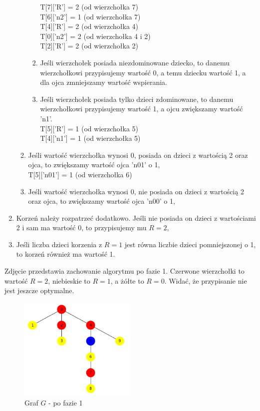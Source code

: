 \begin{enumerate}
\begin{enumerate}
\begin{enumerate}
                T[7]['R'] = 2  (od wierzchołka 7)\\
                T[6]['n2'] = 1  (od wierzchołka 7)\\
                T[4]['R'] = 2  (od wierzchołka 4)\\
                T[0]['n2'] = 2  (od wierzchołka 4 i 2)\\
                T[2]['R'] = 2  (od wierzchołka 2)\
                \item Jeśli wierzchołek posiada niezdominowane dziecko, to danemu wierzchołkowi przypisujemy wartość 0, a temu dziecku wartość 1, a dla ojca zmniejszamy wartość wspierania.
                \item Jeśli wierzchołek posiada tylko dzieci zdominowane, to danemu wierzchołkowi przypisujemy wartość 1, a ojcu zwiększamy wartość 'n1'.\\
                T[5]['R'] = 1  (od wierzchołka 5)\\
                T[4]['n1'] = 1  (od wierzchołka 5)
            \end{enumerate}
        \item Jeśli wartość wierzchołka wynosi 0, posiada on dzieci z wartością 2 oraz ojca, to zwiększamy wartość ojca 'n01' o 1,\\
        T[5]['n01'] = 1  (od wierzchołka 6)
        \item Jeśli wartość wierzchołka wynosi 0, nie posiada on dzieci z wartością 2 oraz ojca, to zwiększamy wartość ojca 'n00' o 1,\\
    \end{enumerate}
    \item Korzeń należy rozpatrzeć dodatkowo. Jeśli nie posiada on dzieci z wartościami 2 i sam ma wartość 0, to przypisujemy mu $R=2$,
    \item Jeśli liczba dzieci korzenia z $R=1$ jest równa liczbie dzieci pomniejszonej o 1, to korzeń również ma wartość 1.
\end{enumerate}

Zdjęcie przedstawia zachowanie algorytmu po fazie 1. Czerwone wierzchołki to wartość $R=2$, niebieskie to $R=1$, a żółte to $R=0$. Widać, że przypisanie nie jest jeszcze optymalne.

\begin{figure}[H]
    \centering
    \includegraphics[width=0.5\textwidth]{assets/phase1.png}
    \caption{Graf $G$ - po fazie 1}
    \label{fig:drzewoFaza1}
\end{figure}

